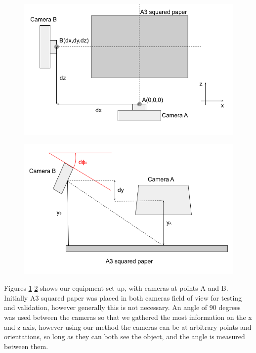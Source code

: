 \documentclass{article}
\begin{document}
\begin{figure}[]
\centering
\includegraphics[width=.52\textheight]{Topdown.png}
\label{fig:ex1}
\end{figure}

\begin{figure}[h!]
\centering
\includegraphics[width=.4\textheight]{Sideon.png}
\label{fig:ex2}
\end{figure}

Figures \ref{fig:ex1}-\ref{fig:ex2} shows our equipment set up, with cameras at points A and B. Initially A3 squared paper was placed in both cameras field of view for testing and validation, however generally this is not necessary. An angle of 90 degrees was used between the cameras so that we gathered the most information on the x and z axis, however using our method the cameras can be at arbitrary points and orientations, so long as they can both see the object, and the angle is measured between them. 
\end{document}
